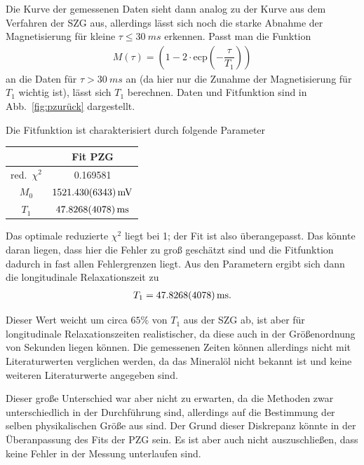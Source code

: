 \documentclass[10pt]{article}
\newenvironment{Figure}
  {\par\medskip\noindent\minipage{\linewidth}}
  {\endminipage\par\medskip}
\begin{document}
\begin{multicols}{2}
Die Kurve der gemessenen Daten sieht dann analog zu der Kurve aus dem Verfahren der SZG aus, allerdings lässt sich noch die starke Abnahme der Magnetisierung für kleine $\tau \leq \SI{30}{ms}$ erkennen.
Passt man die Funktion
\begin{align} 
        M\left(\tau \right)=\left(1-2\cdot \text{ecp}\left(-\dfrac{\tau }{T_1}\right)\right)
\end{align} 
an die Daten für $\tau >\SI{30}{ms}$ an (da hier nur die Zunahme der Magnetisierung für $T_1$ wichtig ist), lässt sich $T_1$ berechnen.
Daten und Fitfunktion sind in Abb.\ \ref{fig:pzurück} dargestellt.
  \begin{Figure}
    \centering\resizebox{\textwidth}{!}{}
    \label{fig:pzurück}
  \end{Figure}
Die Fitfunktion ist charakterisiert durch folgende Parameter
  \begin{center}
    \begin{tabular}{c|c}
    & Fit PZG\\
    \hline
    red.\ $\chi^2$ & 0.169581\\
    $M_0$ & $\SI{1521.43+-6.343}{mV}$ \\
    $T_1$ & $\SI{47.8268+-0.4078}{ms}$ 
    \end{tabular}
  \label{Tab:PZG_para}
  \end{center}
Das optimale reduzierte $\chi ^2$ liegt bei 1; der Fit ist also überangepasst.
Das könnte daran liegen, dass hier die Fehler zu groß geschätzt sind und die Fitfunktion dadurch in fast allen Fehlergrenzen liegt.
Aus den Parametern ergibt sich dann die longitudinale Relaxationszeit zu
\begin{align} 
        T_1=\SI{47.8268+-0.4078}{ms}
.\end{align} 

Dieser Wert weicht um circa $65\%$ von $T_1$ aus der SZG ab, ist aber für longitudinale Relaxationszeiten realistischer, da diese auch in der Größenordnung von Sekunden liegen können.
Die gemessenen Zeiten können allerdings nicht mit Literaturwerten verglichen werden, da das Mineralöl nicht bekannt ist und keine weiteren Literaturwerte angegeben sind.

Dieser große Unterschied war aber nicht zu erwarten, da die Methoden zwar unterschiedlich in der Durchführung sind, allerdings auf die Bestimmung der selben physikalischen Größe aus sind.
Der Grund dieser Diskrepanz könnte in der Überanpassung des Fits der PZG sein.
Es ist aber auch nicht auszuschließen, dass keine Fehler in der Messung unterlaufen sind.


\end{multicols}
\end{document}
